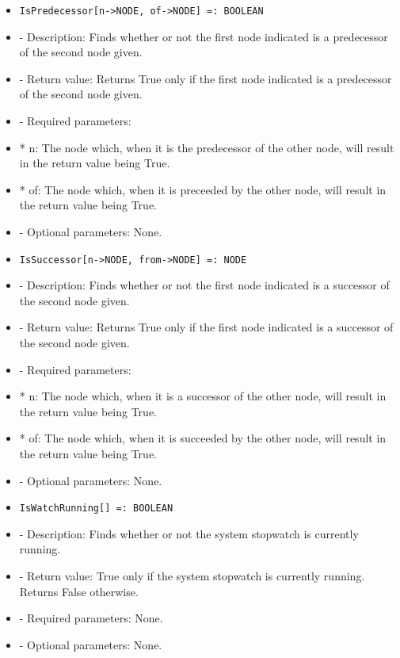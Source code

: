 \begin{itemize}
\item
\begin{verbatim}
IsPredecessor[n->NODE, of->NODE] =: BOOLEAN
\end{verbatim}

\bd
\item
- Description:  Finds whether or not the first node indicated is a 
predecessor of the second node given.
\item
- Return value:  Returns True only if the first node indicated is a
predecessor of the second node given.
\item
- Required parameters:

\bd
\item
*  n:  The node which, when it is the predecessor of the other node,
will result in the return value being True.
\item
*  of:  The node which, when it is preceeded by the other node, will
result in the return value being True.
\ed

\item
- Optional parameters:  None.
\ed

\item
\begin{verbatim}
IsSuccessor[n->NODE, from->NODE] =: NODE
\end{verbatim}

\bd
\item
- Description:  Finds whether or not the first node indicated is a 
successor of the second node given.
\item
- Return value:  Returns True only if the first node indicated is a successor of the second node given.
\item
- Required parameters:
	
\bd
\item
*  n:  The node which, when it is a successor of the other node, will
result in the return value being True.
\item
*  of:  The node which, when it is succeeded by the other node, will
result in the return value being True.
\ed

\item
- Optional parameters:  None.
\ed

\item
\begin{verbatim}
IsWatchRunning[] =: BOOLEAN
\end{verbatim}

\bd
\item
- Description:  Finds whether or not the system stopwatch is currently
running.
\item
- Return value:  True only if the system stopwatch is currently running.
Returns False otherwise.
\item
- Required parameters:  None.
\item
- Optional parameters:  None.
\ed


\end{itemize}
